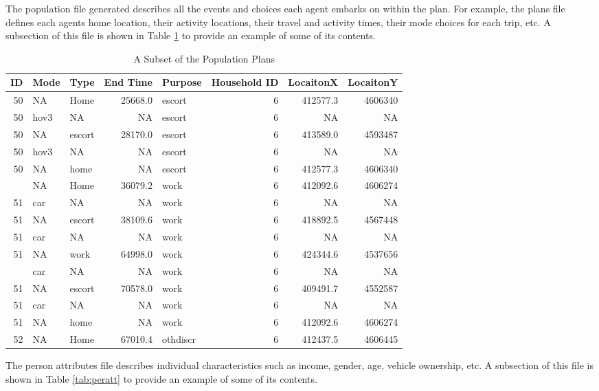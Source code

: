 \documentclass[12pt, oneside, openright]{byuthesis}
\begin{document}
The population file generated describes all the events and choices each agent embarks on within the plan. For example, the plans file defines each agents home location, their activity locations, their travel and activity times, their mode choices for each trip, etc. A subsection of this file is shown in Table \ref{tab:plans} to provide an example of some of its contents.

\begin{table}

\caption{\label{tab:plans}A Subset of the Population Plans}
\centering
\begin{tabular}[t]{rllrlrrr}
\toprule
ID & Mode & Type & End Time & Purpose & Household ID & LocaitonX & LocaitonY\\
\midrule
50 & NA & Home & 25668.0 & escort & 6 & 412577.3 & 4606340\\
50 & hov3 & NA & NA & escort & 6 & NA & NA\\
50 & NA & escort & 28170.0 & escort & 6 & 413589.0 & 4593487\\
50 & hov3 & NA & NA & escort & 6 & NA & NA\\
50 & NA & home & NA & escort & 6 & 412577.3 & 4606340\\
\addlinespace
51 & NA & Home & 36079.2 & work & 6 & 412092.6 & 4606274\\
51 & car & NA & NA & work & 6 & NA & NA\\
51 & NA & escort & 38109.6 & work & 6 & 418892.5 & 4567448\\
51 & car & NA & NA & work & 6 & NA & NA\\
51 & NA & work & 64998.0 & work & 6 & 424344.6 & 4537656\\
\addlinespace
51 & car & NA & NA & work & 6 & NA & NA\\
51 & NA & escort & 70578.0 & work & 6 & 409491.7 & 4552587\\
51 & car & NA & NA & work & 6 & NA & NA\\
51 & NA & home & NA & work & 6 & 412092.6 & 4606274\\
52 & NA & Home & 67010.4 & othdiscr & 6 & 412437.5 & 4606445\\
\bottomrule
\end{tabular}
\end{table}

The person attributes file describes individual characteristics such as income, gender, age, vehicle ownership, etc. A subsection of this file is shown in Table \ref{tab:peratt} to provide an example of some of its contents.
\end{document}
